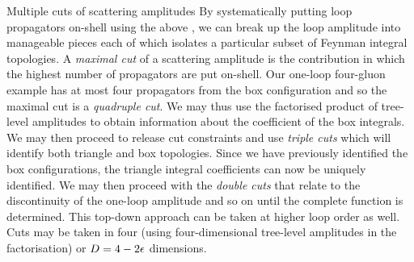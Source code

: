 \begin{important}{Multiple cuts of scattering amplitudes}
  By systematically putting loop propagators on-shell using the above
  , we can break up the loop amplitude into manageable pieces
  each of which isolates a particular subset of Feynman integral topologies. A
  \textit{maximal cut} of a scattering amplitude is the contribution in which
  the highest number of propagators are put on-shell. Our
  one-loop four-gluon example has at most four propagators from the box
  configuration and so the maximal cut is a \textit{quadruple cut}. We may thus
  use the factorised product of tree-level amplitudes to obtain information
  about the coefficient of the box integrals. We may then proceed to release
  cut constraints and use \textit{triple cuts} which will identify both
  triangle and box topologies. Since we have previously identified the box
  configurations, the triangle integral coefficients can now be uniquely
  identified. We may then proceed with the \textit{double cuts} that relate to
  the discontinuity of the one-loop amplitude and so on until the complete
  function is determined. This top-down approach can be taken at higher loop
  order as well. Cuts may be taken in four (using four-dimensional tree-level amplitudes in the
  factorisation) or $D=4-2\epsilon$ dimensions.
\end{important}

